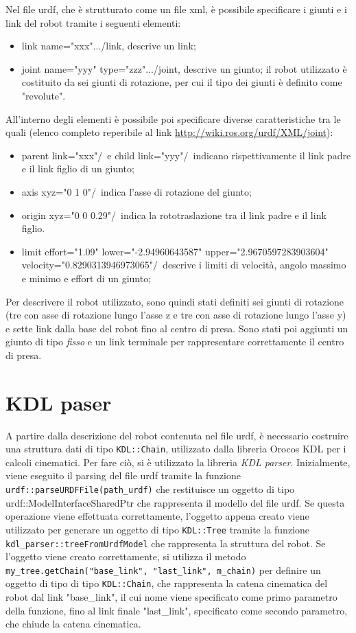 Nel file urdf, che è strutturato come un file xml, è possibile specificare i giunti e i link del robot tramite i seguenti elementi:
\begin{itemize}
	\item \tl link name="xxx"\tr...\tl /link\tr, descrive un link;
	\item \tl joint name="yyy" type="zzz"\tr...\tl /joint\tr, descrive un giunto; il robot utilizzato è costituito da sei giunti di rotazione, per cui il tipo dei giunti è definito come "revolute".
\end{itemize}
All'interno degli elementi è possibile poi specificare diverse caratteristiche tra le quali (elenco completo reperibile al link \url{http://wiki.ros.org/urdf/XML/joint}):
\begin{itemize}
	\item  \tl parent link="xxx"/\tr\ e \tl child link="yyy"/\tr\ indicano rispettivamente il link padre e il link figlio di un giunto;
	\item \tl axis xyz="0 1 0"/\tr\ indica l'asse di rotazione del giunto;
	\item  \tl origin xyz="0 0 0.29"/\tr\ indica la rototraslazione tra il link padre e il link figlio.
	\item \tl limit effort="1.09" lower="-2.94960643587" upper="2.9670597283903604" velocity="0.8290313946973065"/\tr \ descrive i limiti di velocità, angolo massimo e minimo e effort di un giunto;
\end{itemize}
Per descrivere il robot utilizzato, sono quindi stati definiti sei giunti di rotazione (tre con asse di rotazione lungo l'asse z e tre con asse di rotazione lungo l'asse y) e sette link dalla base del robot fino al centro di presa. Sono stati poi aggiunti un giunto di tipo \textit{fisso} e un link terminale per rappresentare correttamente il centro di presa.

\clearpage

\section{KDL paser}
A partire dalla descrizione del robot contenuta nel file urdf, è necessario costruire una struttura dati di tipo \texttt{KDL::Chain}, utilizzato dalla libreria Orocos KDL per i calcoli cinematici. Per fare ciò, si è utilizzato la libreria \textit{KDL parser}. Inizialmente, viene eseguito il parsing del file urdf tramite la funzione \texttt{urdf::parseURDFFile(path\_urdf)} che restituisce un oggetto di tipo urdf::ModelInterfaceSharedPtr che rappresenta il modello del file urdf. Se questa operazione viene effettuata correttamente, l'oggetto appena creato viene utilizzato per generare un oggetto di tipo \texttt{KDL::Tree} tramite la funzione \texttt{kdl\_parser::treeFromUrdfModel} che rappresenta la struttura del robot. Se l'oggetto viene creato correttamente, si utilizza il metodo \texttt{my\_tree.getChain("base\_link", "last\_link", m\_chain)} per definire un oggetto di tipo di tipo \texttt{KDL::Chain}, che rappresenta la catena cinematica del robot dal link "base\_link", il cui nome viene specificato come primo parametro della funzione, fino al link finale "last\_link", specificato come secondo parametro, che chiude la catena cinematica.

